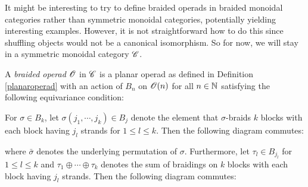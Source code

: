     It might be interesting to try to define braided operads in braided monoidal
    categories rather than symmetric monoidal categories, potentially yielding
    interesting examples. However, it is not straightforward how to do this since
    shuffling objects would not be a canonical isomorphism. So for now, we will
    stay in a symmetric monoidal category $\mathscr{C}$.

\begin{defin}\label{def-br-operad} A {\em braided operad} $\mathscr{O}$ in $\mathscr{C}$ is a
    planar operad as defined in Definition \ref{planaroperad} with an action of
    $B_n$ on $\mathscr{O}(n)$ for all $n \in \mathbb{N}$ satisfying the following equivariance
    condition: 
    
    For $\sigma \in B_k$, let $\sigma(j_1, \cdots, j_k) \in B_j$
    denote the element that $\sigma$-braids $k$ blocks with each block having
    $j_l$ strands for $1 \leq l \leq k$. Then the following diagram commutes:
    \begin{center}
    \end{center}      
    where $\bar{\sigma}$ denotes the underlying permutation of $\sigma$.
    Furthermore, let $\tau_l \in B_{j_l}$ for $1 \leq l \leq k$ and
    $\tau_1 \oplus \cdots \oplus \tau_k$ denotes the sum of braidings on
    $k$ blocks with each block having $j_l$ strands. Then the following
    diagram commutes:
    \begin{center}
    \end{center}
\end{defin}

